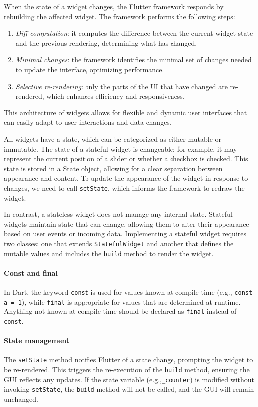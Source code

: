 When the state of a widget changes, the Flutter framework responds by rebuilding the affected widget. 
The framework performs the following steps:
\begin{enumerate}
    \item \textit{Diff computation}: it computes the difference between the current widget state and the previous rendering, determining what has changed.
    \item \textit{Minimal changes}: the framework identifies the minimal set of changes needed to update the interface, optimizing performance.
    \item \textit{Selective re-rendering}: only the parts of the UI that have changed are re-rendered, which enhances efficiency and responsiveness.
\end{enumerate}
This architecture of widgets allows for flexible and dynamic user interfaces that can easily adapt to user interactions and data changes.

All widgets have a state, which can be categorized as either mutable or immutable.
The state of a stateful widget is changeable; for example, it may represent the current position of a slider or whether a checkbox is checked. 
This state is stored in a State object, allowing for a clear separation between appearance and content. 
To update the appearance of the widget in response to changes, we need to call \texttt{setState}, which informs the framework to redraw the widget.

In contrast, a stateless widget does not manage any internal state. 
Stateful widgets maintain state that can change, allowing them to alter their appearance based on user events or incoming data. 
Implementing a stateful widget requires two classes: one that extends \texttt{StatefulWidget} and another that defines the mutable values and includes the \texttt{build} method to render the widget.

\paragraph*{Const and final}
In Dart, the keyword \texttt{const} is used for values known at compile time (e.g., \texttt{const a = 1}), while \texttt{final} is appropriate for values that are determined at runtime. 
Anything not known at compile time should be declared as \texttt{final} instead of \texttt{const}.

\paragraph*{State management}
The \texttt{setState} method notifies Flutter of a state change, prompting the widget to be re-rendered. 
This triggers the re-execution of the \texttt{build} method, ensuring the GUI reflects any updates. 
If the state variable (e.g.,\texttt{\_counter}) is modified without invoking \texttt{setState}, the \texttt{build} method will not be called, and the GUI will remain unchanged.

